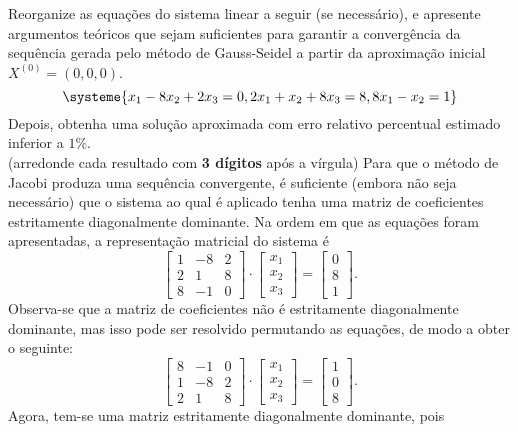 \documentclass[12pt,a4paper]{article}
\begin{document}
\begin{ExerciseList}
\Exercise[title={2,5}]
Reorganize as equações do sistema linear a seguir (se necessário), e apresente argumentos teóricos que sejam suficientes para garantir a convergência da sequência gerada pelo método de Gauss-Seidel a partir da aproximação inicial $X^{(0)} = (0, 0, 0)$.
\[
\systeme{
 x_1-8x_2 + 2x_3 = 0,
2x_1+ x_2 + 8x_3 = 8,
8x_1- x_2        = 1
}
\]
Depois, obtenha uma solução aproximada com erro relativo percentual estimado inferior a $1\%$.\\
(arredonde cada resultado com \textbf{3 dígitos} após a vírgula)
\Answer
Para que o método de Jacobi produza uma sequência convergente, é suficiente (embora não seja necessário) que o sistema ao qual é aplicado tenha uma matriz de coeficientes estritamente diagonalmente dominante. Na ordem em que as equações foram apresentadas, a representação matricial do sistema é
\[
\begin{bmatrix}
1 & -8 & 2 \\
2 &  1 & 8 \\
8 & -1 & 0
\end{bmatrix}
\cdot
\begin{bmatrix}
x_1 \\ x_2 \\ x_3
\end{bmatrix}
=
\begin{bmatrix}
0 \\ 8 \\ 1
\end{bmatrix}.
\]
Observa-se que a matriz de coeficientes não é estritamente diagonalmente dominante, mas isso pode ser resolvido permutando as equações, de modo a obter o seguinte:
\[
\begin{bmatrix}
8 & -1 & 0 \\
1 & -8 & 2 \\
2 &  1 & 8
\end{bmatrix}
\cdot
\begin{bmatrix}
x_1 \\ x_2 \\ x_3
\end{bmatrix}
=
\begin{bmatrix}
1 \\ 0 \\ 8
\end{bmatrix}.
\]
Agora, tem-se uma matriz estritamente diagonalmente dominante, pois

\end{ExerciseList}
\end{document}
